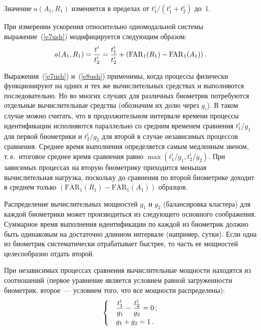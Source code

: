 \begin{multicols}{2}
     Значение $a(A_1,R_1)$ изменяется в пределах от  $t_1^i/(t_1^i+t_2^i)$ до~1.
     
     При измерении ускорения относительно одномодальной системы 
выражение~(\ref{e7ush}) модифицируется следующим образом:
     \begin{equation}
     a(A_1,R_1) =\displaystyle\frac{\displaystyle t^i\mathstrut}{\displaystyle t_2^i\mathstrut} =\displaystyle\frac{\displaystyle t_1^i\mathstrut}{\displaystyle t_2^i\mathstrut}+(\mathrm{FAR}_1(R_1)-
\mathrm{FAR}_1(A_1))\,.
     \label{e8ush}
     \end{equation}
     
     Выражения~(\ref{e7ush}) и~(\ref{e8ush}) применимы, когда процессы физически 
функционируют на одних и тех же вычислительных средствах и выполняются 
последовательно. Но во многих случаях для различных биометрик потребуются 
отдельные вычислительные средства (обозначим их долю через $g_i$). В таком случае 
можно считать, что в продолжительном интервале времени процессы идентификации 
исполняются параллельно со средним временем сравнения $t_1^i/g_1$ для первой 
биометрики и $t_2^i/g_2$ для второй в случае независимых процессов сравнения. 
Среднее время выполнения определяется самым медленным звеном, т.\,е.\ итоговое 
среднее время сравнения равно $\max \left ( t_1^i/g_1,t_2^i/g_2\right )$. При зависимых 
процессах на вторую биометрику приходится меньшая вычислительная нагрузка, 
поскольку до сравнения по второй биометрике доходит в среднем только 
$(\mathrm{FAR}_1(R_1)-\mathrm{FAR}_1(A_1))$ образцов.
     
     Распределение вычислительных мощностей $g_1$ и $g_2$ (балансировка 
кластера) для каждой био\-мет\-ри\-ки может производиться из следующего основного 
соображения. Суммарное время выполнения идентификации по каждой из биометрик 
должно быть одинаковым на достаточно длинном интервале (например, сутки). Если 
одна из биометрик систематически отрабатывает быстрее, то часть ее мощностей 
целесообразно отдать второй.
     
     При независимых процессах сравнения вы\-чис\-ли\-тельные мощности находятся из 
соотношений (первое уравнение является условием равной загруженности биометрик, 
второе~--- условием того, что все мощности распределены):
     \begin{equation}
     \begin{cases} 
     &\displaystyle\frac{\displaystyle t_1^i\mathstrut}{\displaystyle g_1\mathstrut} -\displaystyle\frac{\displaystyle t_2^i\mathstrut}{\displaystyle g_2\mathstrut}  =0\,;\\
     &g_1+g_2  =1\,.
     \end{cases}
     \label{e9ush}
     \end{equation}
     

\end{multicols}

